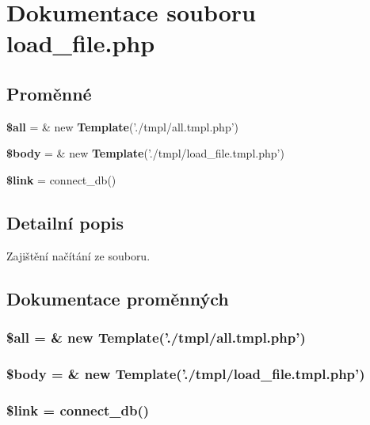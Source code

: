\section{Dokumentace souboru load\_\-file.php}
\label{load__file_8php}
\subsection*{Proměnné}
\begin{CompactItemize}
\item 
{\bf \$all} = \& new {\bf Template}('./tmpl/all.tmpl.php')
\item 
{\bf \$body} = \& new {\bf Template}('./tmpl/load\_\-file.tmpl.php')
\item 
{\bf \$link} = connect\_\-db()
\end{CompactItemize}


\subsection{Detailní popis}
Zajištění načítání ze souboru. 

\subsection{Dokumentace proměnných}
\subsubsection{\setlength{\rightskip}{0pt plus 5cm}\$all = \& new {\bf Template}('./tmpl/all.tmpl.php')}\label{load__file_8php_3c74ea9d2348c9aba28d36e692bef2d2}


\subsubsection{\setlength{\rightskip}{0pt plus 5cm}\$body = \& new {\bf Template}('./tmpl/load\_\-file.tmpl.php')}\label{load__file_8php_26b9f9373f7bb79dfcf8a86dff086b45}


\subsubsection{\setlength{\rightskip}{0pt plus 5cm}\$link = connect\_\-db()}\label{load__file_8php_5d346e31b75d916e3bac9cb193bfc97f}


